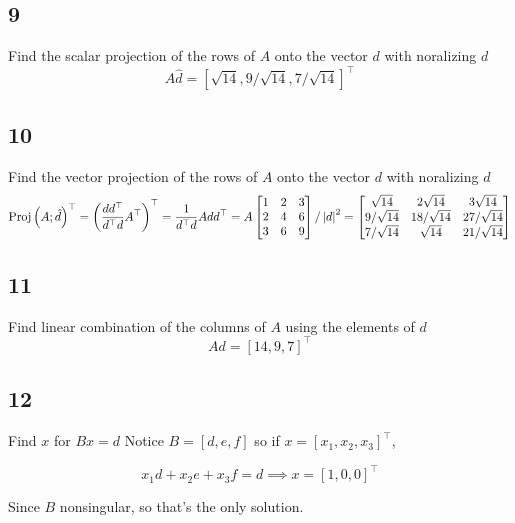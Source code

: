 \documentclass{article}
\begin{document}
\subsection*{9}
\begin{myleftlinebox}
    Find the scalar projection of the rows of \(A\) onto the vector \(d\) with noralizing \(d\)
    \tcblower
    \[
        A\hat d= [\sqrt{14},9/\sqrt{14},7/\sqrt{14}]^\top
    \]
\end{myleftlinebox}


\subsection*{10}
\begin{myleftlinebox}
    Find the vector projection of the rows of \(A\) onto the vector \(d\) with noralizing \(d\)
    \tcblower
    \[
        \operatorname*{Proj}\left( A;\hat d \right)^\top = \left( \frac{d d^\top}{d^\top d}A^\top \right)^\top =\frac{1}{d^\top d}A d d^\top= A \begin{bmatrix}
            1 & 2 & 3\\
            2 & 4 & 6\\
            3 & 6 & 9
        \end{bmatrix}/\left\vert d\right\vert^2 =  \begin{bmatrix}
            \sqrt{14} & 2\sqrt{14} & 3\sqrt{14}\\
            9/\sqrt{14} & 18/\sqrt{14} & 27/\sqrt{14} \\
            7/\sqrt{14} & \sqrt{14} & 21/\sqrt{14}
        \end{bmatrix}
    \]
\end{myleftlinebox}



\subsection*{11}
\begin{myleftlinebox}
    Find linear combination of the columns of \(A\) using the elements of \(d\)
    \tcblower
    \[
        Ad = [14,9,7]^\top
    \]
\end{myleftlinebox}



\subsection*{12}
\begin{myleftlinebox}
    Find \(x\) for \(Bx=d\)
    \tcblower
    Notice \(B=[d,e,f]\) so if \(x = [x_1,x_2,x_3]^\top\),

    \[
        x_1 d+x_2 e+x_3 f = d \implies x=[1,0,0]^\top
    \]

    Since \(B\) nonsingular, so that's the only solution.

\end{myleftlinebox}
\end{document}
